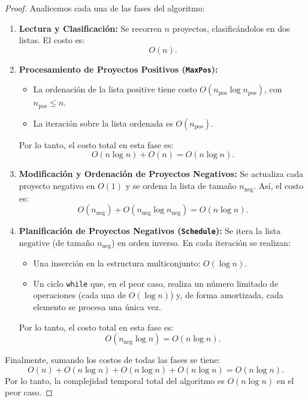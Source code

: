 ﻿\documentclass{article}
\theoremstyle{plain}
\theoremstyle{definition}
\begin{document}
\begin{proof}
Analicemos cada una de las fases del algoritmo:

\begin{enumerate}
    \item \textbf{Lectura y Clasificación:}  
    Se recorren \(n\) proyectos, clasificándolos en dos listas. El costo es:
    \[
    O(n).
    \]
    
    \item \textbf{Procesamiento de Proyectos Positivos (\texttt{MaxPos}):}  
    \begin{itemize}
        \item La ordenación de la lista \(\text{positive}\) tiene costo \(O(n_{\text{pos}} \log n_{\text{pos}})\), con \(n_{\text{pos}} \le n\).
        \item La iteración sobre la lista ordenada es \(O(n_{\text{pos}})\).
    \end{itemize}
    Por lo tanto, el costo total en esta fase es:
    \[
    O(n \log n) + O(n) = O(n \log n).
    \]
    
    \item \textbf{Modificación y Ordenación de Proyectos Negativos:}  
    Se actualiza cada proyecto negativo en \(O(1)\) y se ordena la lista de tamaño \(n_{\text{neg}}\). Así, el costo es:
    \[
    O(n_{\text{neg}}) + O(n_{\text{neg}} \log n_{\text{neg}}) = O(n \log n).
    \]
    
    \item \textbf{Planificación de Proyectos Negativos (\texttt{Schedule}):}  
    Se itera la lista \(\text{negative}\) (de tamaño \(n_{\text{neg}}\)) en orden inverso. En cada iteración se realizan:
    \begin{itemize}
        \item Una inserción en la estructura multiconjunto: \(O(\log n)\).
        \item Un ciclo \texttt{while} que, en el peor caso, realiza un número limitado de operaciones (cada una de \(O(\log n)\)) y, de forma amortizada, cada elemento se procesa una única vez.
    \end{itemize}
    Por lo tanto, el costo total en esta fase es:
    \[
    O(n_{\text{neg}} \log n) = O(n \log n).
    \]
\end{enumerate}

Finalmente, sumando los costos de todas las fases se tiene:
\[
O(n) + O(n \log n) + O(n \log n) + O(n \log n) = O(n \log n).
\]
Por lo tanto, la complejidad temporal total del algoritmo es \(O(n \log n)\) en el peor caso.
\end{proof}
\end{document}
